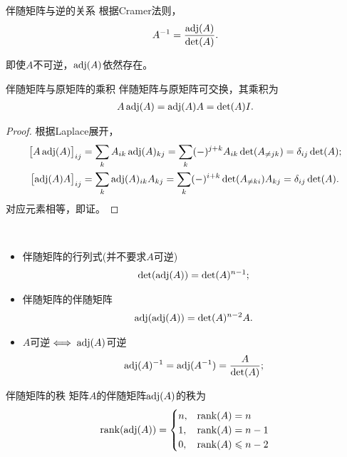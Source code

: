 \begin{theorem}
	{伴随矩阵与逆的关系}{}
	根据Cramer法则，
	\begin{align}
		A^{-1}=\frac{\operatorname{adj}(A)}{\det(A)}.
	\end{align}
\end{theorem}
\begin{remark}
	即使$A$不可逆，$\operatorname{adj}(A)$依然存在。
\end{remark}
\begin{theorem}{伴随矩阵与原矩阵的乘积}{}
	伴随矩阵与原矩阵可交换，其乘积为
	\begin{align}
		A\operatorname{adj}(A)=\operatorname{adj}(A)A=\det(A)I.
	\end{align}
\end{theorem}
\begin{proof}
	根据Laplace展开，
	\begin{align*}
		\bigfkh{A\adj(A)}_{ij}&=\sum_{k}A_{ik}\adj(A)_{kj}=\sum_{k}(-)^{j+k}A_{ik}\det(A_{\neq jk})=\vd_{ij}\det(A);\\
		\bigfkh{\adj(A)A}_{ij}&=\sum_{k}\adj(A)_{ik}A_{kj}=\sum_{k}(-)^{i+k}\det(A_{\neq ki})A_{kj}=\vd_{ij}\det(A).%
	\end{align*}
	对应元素相等，即证。
\end{proof}
\begin{corollary}
	~
	\begin{itemize}
		\item %
		伴随矩阵的行列式(并不要求$A$可逆)
		\begin{align}
			\det(\operatorname{adj}(A))=\det(A)^{n-1};
		\end{align}
		\item 伴随矩阵的伴随矩阵
		\begin{align}
			\operatorname{adj}(\operatorname{adj}(A))=\det(A)^{n-2}A.
		\end{align}
		\item $A$可逆$\iff\operatorname{adj}(A)$可逆
		\begin{align}
			\operatorname{adj}(A)^{-1}=\operatorname{adj}(A^{-1})=\frac{A}{\det(A)};
		\end{align}
	\end{itemize}
\end{corollary}

\begin{theorem}
	{伴随矩阵的秩}{}
	矩阵$A$的伴随矩阵$\operatorname{adj}(A)$的秩为
	\begin{equation}
		\operatorname{rank}(\operatorname{adj}(A))=\begin{cases}
			n,&\operatorname{rank}(A)=n\\
			1,&\operatorname{rank}(A)=n-1\\
			0,&\operatorname{rank}(A)\leqslant n-2\\
		\end{cases}
	\end{equation}
\end{theorem}

